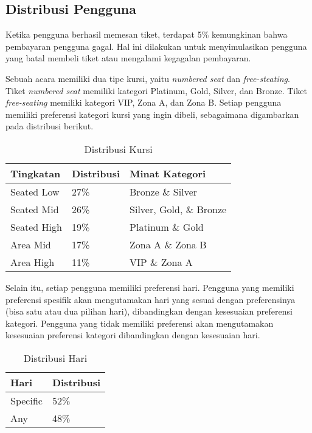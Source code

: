 \subsection{Distribusi Pengguna}

Ketika pengguna berhasil memesan tiket, terdapat 5\% kemungkinan bahwa pembayaran pengguna gagal. Hal ini dilakukan untuk menyimulasikan pengguna yang batal membeli tiket atau mengalami kegagalan pembayaran.

Sebuah acara memiliki dua tipe kursi, yaitu \textit{numbered seat} dan \textit{free-steating}. Tiket \textit{numbered seat} memiliki kategori Platinum, Gold, Silver, dan Bronze. Tiket \textit{free-seating} memiliki kategori VIP, Zona A, dan Zona B. Setiap pengguna memiliki preferensi kategori kursi yang ingin dibeli, sebagaimana digambarkan pada distribusi berikut.

\begin{table}[h]
    \centering
    \begin{tabular}{|l|l|l|}
        \hline
        \textbf{Tingkatan} & \textbf{Distribusi} & \textbf{Minat Kategori} \\
        \hline
        Seated Low         & 27\%                & Bronze \& Silver        \\
        \hline
        Seated Mid         & 26\%                & Silver, Gold, \& Bronze \\
        \hline
        Seated High        & 19\%                & Platinum \& Gold        \\
        \hline
        Area Mid           & 17\%                & Zona A \& Zona B        \\
        \hline
        Area High          & 11\%                & VIP \& Zona A           \\
        \hline
    \end{tabular}
    \caption{Distribusi Kursi}
\end{table}

Selain itu, setiap pengguna memiliki preferensi hari. Pengguna yang memiliki preferensi spesifik akan mengutamakan hari yang sesuai dengan preferensinya (bisa satu atau dua pilihan hari), dibandingkan dengan kesesuaian preferensi kategori. Pengguna yang tidak memiliki preferensi akan mengutamakan kesesuaian preferensi kategori dibandingkan dengan kesesuaian hari.

\begin{table}[h]
    \centering
    \begin{tabular}{|l|l|}
        \hline
        \textbf{Hari} & \textbf{Distribusi} \\
        \hline
        Specific      & 52\%                \\
        \hline
        Any           & 48\%                \\
        \hline
    \end{tabular}
    \caption{Distribusi Hari}
\end{table}

